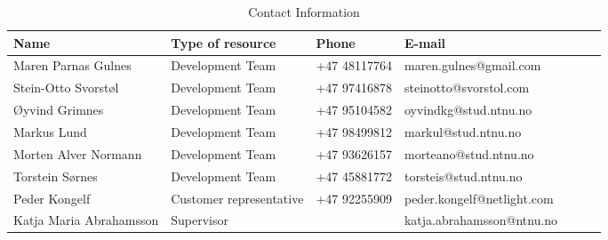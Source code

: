 \begin{table}[h]
\centering
\begin{tabular}{|l|l|l|l|l|l|l|}
\hline
{\textbf{Name}} & 
{\textbf{Type of resource}}&{\textbf{Phone}} & {\textbf{E-mail}} 
\\ \hline
Maren Parnas Gulnes & Development Team & +47 48117764 & maren.gulnes@gmail.com \\ \hline
Stein-Otto Svorstøl & Development Team & +47 97416878 & steinotto@svorstol.com \\ \hline
Øyvind Grimnes & Development Team & +47 95104582 & oyvindkg@stud.ntnu.no \\ \hline
Markus Lund & Development Team & +47 98499812 & markul@stud.ntnu.no \\ \hline
Morten Alver Normann & Development Team & +47 93626157 & morteano@stud.ntnu.no \\ \hline
Torstein Sørnes & Development Team & +47 45881772 & torsteis@stud.ntnu.no \\ \hline

Peder Kongelf & Customer representative & +47 92255909 & peder.kongelf@netlight.com\\ \hline
Katja Maria Abrahamsson & Supervisor & & katja.abrahamsson@ntnu.no
\\ \hline
\end{tabular}
\caption{Contact Information}
\label{table:contact-information}
\end{table}